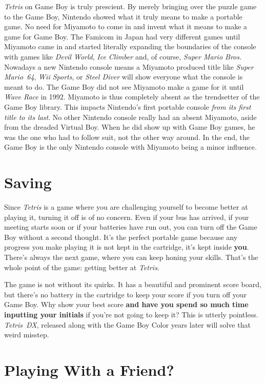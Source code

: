 \documentclass{book}
\begin{document}
\emph{Tetris} on Game Boy is truly prescient. By merely bringing over the puzzle game to the Game Boy, Nintendo showed what it truly means to make a portable game. No need for Miyamoto to come in and invent what it means to make a game for Game Boy. The Famicom in Japan had very different games until Miyamoto came in and started literally expanding the boundaries of the console with games like \emph{Devil World}, \emph{Ice Climber} and, of course, \emph{Super Mario Bros.} Nowadays a new Nintendo console means a Miyamoto produced title like \emph{Super Mario~64}, \emph{Wii Sports}, or \emph{Steel Diver} will show everyone what the console is meant to do. The Game Boy did not see Miyamoto make a game for it until \emph{Wave Race} in 1992. Miyamoto is thus completely absent as the trendsetter of the Game Boy library. This impacts Nintendo’s first portable console \emph{from its first title to its last}. No other Nintendo console really had an absent Miyamoto, aside from the dreaded Virtual Boy. When he did show up with Game Boy games, he was the one who had to follow suit, not the other way around. In the end, the Game Boy is the only Nintendo console with Miyamoto being a minor influence.\par
\FloatBarrier\section*{Saving}
Since \emph{Tetris} is a game where you are challenging yourself to become better at playing it, turning it off is of no concern. Even if your bus has arrived, if your meeting starts soon or if your batteries have run out, you can turn off the Game Boy without a second thought. It’s the perfect portable game because any progress you make playing it is not kept in the cartridge, it’s kept inside \textbf{you}. There’s always the next game, where you can keep honing your skills. That’s the whole point of the game: getting better at \emph{Tetris}.\par
The game is not without its quirks. It has a beautiful and prominent score board, but there’s no battery in the cartridge to keep your score if you turn off your Game Boy. Why show your best score \textbf{and have you spend so much time inputting your initials} if you’re not going to keep it? This is utterly pointless. \emph{Tetris~DX}, released along with the Game Boy Color years later will solve that weird misstep.\par
\FloatBarrier\section*{Playing With a Friend?}
\end{document}
